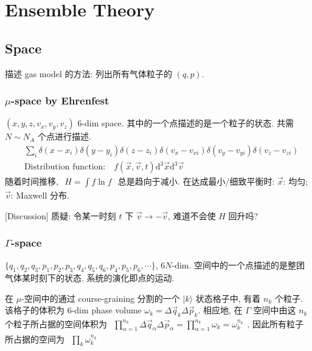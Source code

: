 \documentclass[../../main.tex]{subfiles}
\begin{document}
\section{Ensemble Theory}
\subsection{Space}
描述 gas model 的方法: 列出所有气体粒子的 $(q,p)$. 

\subsubsection{$\mu$-space by Ehrenfest}
    $(x,y,z,v_{x},v_{y},v_{z})$ 6-dim space. 其中的一个点描述的是一个粒子的状态. 共需 $N\sim N_{A}$ 个点进行描述. 
    \begin{align*}
        &\sum_{i}\delta(x-x_{i})\delta(y-y_{i})\delta(z-z_{i})\delta(v_{x}-v_{xi})\delta(v_{y}-v_{yi})\delta(v_{z}-v_{zi}) \\
        &\text{Distribution function:}\quad f(\vec{x},\vec{v},t)\mathrm{d}^{3}\vec{x}\mathrm{d}^3\vec{v}
    \end{align*}
    随着时间推移, $\begin{aligned}
        H = \int f\ln{f}
    \end{aligned}$ 总是趋向于减小. 在达成最小/细致平衡时: $\vec{x}$: 均匀; $\vec{v}$: Maxwell 分布. 
    
    [Discussion] 质疑: 令某一时刻 $t$ 下 $\vec{v}\rightarrow -\vec{v}$, 难道不会使 $H$ 回升吗? 
    
    \subsubsection{$\Gamma$-space}
    $\{q_{1},q_{2},q_{3},p_{1},p_{2},p_{3},q_{4},q_{5},q_{6},p_{4},p_{5},p_{6},\cdots\}$, $6N$-dim. 空间中的一个点描述的是整团气体某时刻下的状态. 系统的演化即点的运动.

    在 $\mu$-空间中的通过 course-graining 分割的一个 $|k\rangle$ 状态格子中, 有着 $n_{k}$ 个粒子. 该格子的体积为 6-dim phase volume $\omega_{k} = \Delta\vec{q}_{k}\Delta\vec{p}_{k}$. 相应地, 在 $\Gamma$ 空间中由这 $n_{k}$ 个粒子所占据的空间体积为 $\begin{aligned}
        \prod_{\alpha=1}^{n_{k}}\Delta\vec{q}_{\alpha}\Delta\vec{p}_{\alpha} = \prod_{\alpha=1}^{n_{k}}\omega_{k} = \omega_{k}^{n_{k}}
    \end{aligned}$. 因此所有粒子所占据的空间为 
    $\begin{aligned}
        \prod_{k}\omega_{k}^{n_{k}}
    \end{aligned}$
\end{document}
